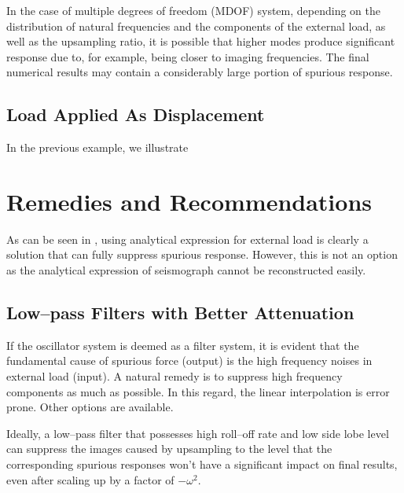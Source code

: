 In the case of multiple degrees of freedom (MDOF) system, depending on the distribution of natural frequencies and the components of the external load, as well as the upsampling ratio, it is possible that higher modes produce significant response due to, for example, being closer to imaging frequencies. The final numerical results may contain a considerably large portion of spurious response.
\subsection{Load Applied As Displacement}
In the previous example, we illustrate
\section{Remedies and Recommendations}
As can be seen in , using analytical expression for external load is clearly a solution that can fully suppress spurious response. However, this is not an option as the analytical expression of seismograph cannot be reconstructed easily.
\subsection{Low--pass Filters with Better Attenuation}
If the oscillator system is deemed as a filter system, it is evident that the fundamental cause of spurious force (output) is the high frequency noises in external load (input). A natural remedy is to suppress high frequency components as much as possible. In this regard, the linear interpolation is error prone. Other options are available.

Ideally, a low--pass filter that possesses high roll--off rate and low side lobe level can suppress the images caused by upsampling to the level that the corresponding spurious responses won't have a significant impact on final results, even after scaling up by a factor of $-\omega^2$.

